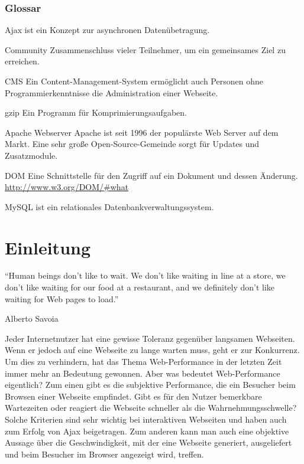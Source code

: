 \section*{Glossar}
\begin{basedescript}{\desclabelstyle{\pushlabel}\desclabelwidth{6em}}
  \item[Ajax] ist ein Konzept zur asynchronen Daten\"ubetragung.
  \item[Community] Zusammenschluss vieler Teilnehmer, um ein gemeinsames Ziel zu erreichen.
  \item[CMS] Ein Content-Management-System erm\"oglicht auch Personen ohne Programmierkenntnisse die Administration einer Webseite.
  \item[gzip] Ein Programm f\"ur Komprimierungsaufgaben.
  \item[Apache Webserver] Apache ist seit 1996 der popul\"arste Web Server auf dem Markt. Eine sehr gro\ss{}e Open-Source-Gemeinde sorgt f\"ur Updates und Zusatzmodule.
  \item[DOM] Eine Schnittstelle f\"ur den Zugriff auf ein Dokument und dessen \"Anderung. \url{http://www.w3.org/DOM/\#what}
  \item[MySQL] ist ein relationales Datenbankverwaltungssystem. 
 
\end{basedescript}
\newpage
\part{Einleitung}
\epigraph{``Human beings don’t like to wait. We don’t like waiting in line at a store, we don’t like waiting for our food at a restaurant, and we definitely don’t like waiting for Web pages to load.''}{Alberto Savoia}

Jeder Internetnutzer hat eine gewisse Toleranz gegenüber langsamen Webseiten. Wenn er jedoch auf eine Webseite zu lange warten muss, geht er zur Konkurrenz\citep{websiteoptimization2008}. Um dies zu verhindern, hat das Thema Web-Performance in der letzten Zeit immer mehr an Bedeutung gewonnen. Aber was bedeutet Web-Performance eigentlich? Zum einen gibt es die subjektive Performance, die ein Besucher beim Browsen einer Webseite empfindet. Gibt es für den Nutzer bemerkbare Wartezeiten oder reagiert die Webseite schneller als die Wahrnehmungsschwelle? Solche Kriterien sind sehr wichtig bei interaktiven Webseiten und haben auch zum Erfolg von Ajax beigetragen. Zum anderen kann man auch eine objektive Aussage über die Geschwindigkeit, mit der eine Webseite generiert, ausgeliefert und beim Besucher im Browser angezeigt wird, treffen. 
\label{sec:intro}
